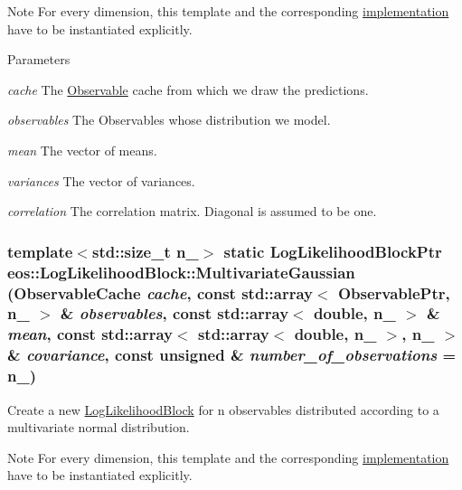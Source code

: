 \begin{DoxyNote}{Note}
For every dimension, this template and the corresponding \hyperlink{namespaceeos_1_1implementation}{implementation} have to be instantiated explicitly.
\end{DoxyNote}

\begin{DoxyParams}{Parameters}
\item[{\em cache}]The \hyperlink{classeos_1_1Observable}{Observable} cache from which we draw the predictions. \item[{\em observables}]The Observables whose distribution we model. \item[{\em mean}]The vector of means. \item[{\em variances}]The vector of variances. \item[{\em correlation}]The correlation matrix. Diagonal is assumed to be one. \end{DoxyParams}
\hypertarget{classeos_1_1LogLikelihoodBlock_a1532bcb8dc34234cb7c4f39a3e82031e}{
\subsubsection[{MultivariateGaussian}]{\setlength{\rightskip}{0pt plus 5cm}template$<$std::size\_\-t n\_\-$>$ static {\bf LogLikelihoodBlockPtr} eos::LogLikelihoodBlock::MultivariateGaussian ({\bf ObservableCache} {\em cache}, \/  const std::array$<$ {\bf ObservablePtr}, n\_\- $>$ \& {\em observables}, \/  const std::array$<$ double, n\_\- $>$ \& {\em mean}, \/  const std::array$<$ std::array$<$ double, n\_\- $>$, n\_\- $>$ \& {\em covariance}, \/  const unsigned \& {\em number\_\-of\_\-observations} = {\ttfamily n\_\-})}}
\label{classeos_1_1LogLikelihoodBlock_a1532bcb8dc34234cb7c4f39a3e82031e}
Create a new \hyperlink{classeos_1_1LogLikelihoodBlock}{LogLikelihoodBlock} for n observables distributed according to a multivariate normal distribution.

\begin{DoxyNote}{Note}
For every dimension, this template and the corresponding \hyperlink{namespaceeos_1_1implementation}{implementation} have to be instantiated explicitly.
\end{DoxyNote}

